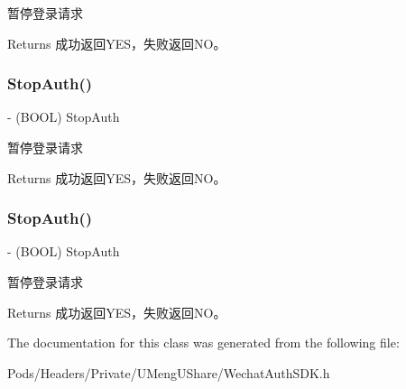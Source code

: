 暂停登录请求 

\begin{DoxyReturn}{Returns}
成功返回\+Y\+E\+S，失败返回\+N\+O。 
\end{DoxyReturn}
\mbox{\label{interface_wechat_auth_s_d_k_a0f5701e66d234c1fc5db69afbed27aca}} 
\subsubsection{\texorpdfstring{Stop\+Auth()}{StopAuth()}\hspace{0.1cm}{\footnotesize\ttfamily [2/3]}}
{\footnotesize\ttfamily -\/ (B\+O\+OL) Stop\+Auth \begin{DoxyParamCaption}{ }\end{DoxyParamCaption}}



暂停登录请求 

\begin{DoxyReturn}{Returns}
成功返回\+Y\+E\+S，失败返回\+N\+O。 
\end{DoxyReturn}
\mbox{\label{interface_wechat_auth_s_d_k_a0f5701e66d234c1fc5db69afbed27aca}} 
\subsubsection{\texorpdfstring{Stop\+Auth()}{StopAuth()}\hspace{0.1cm}{\footnotesize\ttfamily [3/3]}}
{\footnotesize\ttfamily -\/ (B\+O\+OL) Stop\+Auth \begin{DoxyParamCaption}{ }\end{DoxyParamCaption}}



暂停登录请求 

\begin{DoxyReturn}{Returns}
成功返回\+Y\+E\+S，失败返回\+N\+O。 
\end{DoxyReturn}


The documentation for this class was generated from the following file\+:\begin{DoxyCompactItemize}
\item 
Pods/\+Headers/\+Private/\+U\+Meng\+U\+Share/Wechat\+Auth\+S\+D\+K.\+h\end{DoxyCompactItemize}
